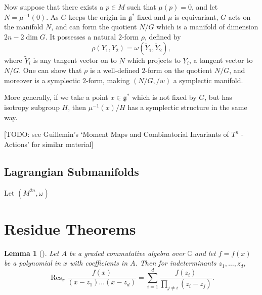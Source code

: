 \documentclass{article}
\newtheorem{lemma}[theorem]{Lemma}
\newcommand{\w}{\omega}
\newcommand{\CC}{\mathbb{C}}
\newcommand{\mfg}{\mathfrak{g}}
\DeclareMathOperator{\Res}{Res}
\begin{document}
	Now suppose that there exists a $p \in M$ such that $\mu(p) = 0$, and let $N = \mu^{-1}(0)$. As $G$ keeps the origin in $\mfg^{\ast}$ fixed and $\mu$ is equivariant, $G$ acts on the manifold $N$, and can form the quotient $N/G$ which is a manifold of dimension $2n - 2\dim G$. It possesses a natural $2$-form $\rho$, defined by
	\[
		\rho(Y_{1}, Y_{2}) = \w(\tilde{Y}_{1}, \tilde{Y}_{2}),
	\]
	where $\tilde{Y}_{i}$ is any tangent vector on to $N$ which projects to $Y_{i}$, a tangent vector to $N/G$. One can show that $\rho$ is a well-defined $2$-form on the quotient $N/G$, and moreover is a symplectic $2$-form, making $(N/G, /w)$ a symplectic manifold.
	
	More generally, if we take a point $x \in \mfg^{\ast}$ which is not fixed by $G$, but has isotropy subgroup $H$, then $\mu^{-1}(x)/H$ has a symplectic structure in the same way.
	
	[TODO: see Guillemin's `Moment Maps and Combinatorial Invariants of $T^{n}$ -Actions' for similar material]
	
	\subsection{Lagrangian Submanifolds}
	
	Let $(M^{2n}, \w)$ 
	
	
	
	
	
	
	
	
	
	
	
	
	
	
	
	
	
	
	
	
	\section{Residue Theorems}
	
	\begin{lemma}[\cite{Guillemin1999}]\label{residue:1}
		Let $A$ be a graded commutative algebra over $\CC$ and let $f = f(x)$ be a polynomial in $x$ with coefficients in $A$. Then for indeterminants $z_{1}, \ldots, z_{d}$,
		\begin{equation*}
			\Res_{x} \frac{f(x)}{(x - z_{1})\ldots(x - z_{d})} = \sum\limits_{i = 1}^{d}\frac{f(z_{i})}{\prod_{j \neq i}(z_{i} - z_{j})}.
		\end{equation*}
	\end{lemma}
	
\end{document}
